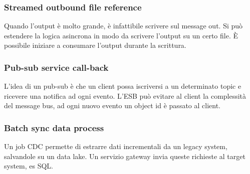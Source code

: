 \subsubsection{Streamed outbound file reference}
Quando l'output è molto grande, è infattibile scrivere sul message out.
Si può estendere la logica asincrona in modo da scrivere l'output su un certo file.
È possibile iniziare a consumare l'output durante la scrittura.

\subsubsection{Pub-sub service call-back}
L'idea di un pub-sub è che un client possa iscriversi a un determinato topic e ricevere
una notifica ad ogni evento.
L'ESB può evitare al client la complessità del message bus, ad ogni nuovo evento 
un object id è passato al client.

\subsubsection{Batch sync data process}
Un job CDC permette di estrarre dati incrementali da un legacy system, salvandole su un data 
lake.
Un servizio gateway invia queste richieste al target system, es SQL.